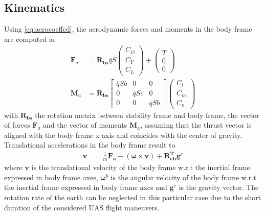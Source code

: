 \documentclass{ifacconf}
\newcommand{\mbf}[1]{\mathbf{#1}}
\providecommand{\mbf}[1]{\mathbf{#1}}
\newcommand{\Rbs}{{\ensuremath{\mbf{R_{b   s}}}}}
\newcommand{\Rbe}{{\ensuremath{\mbf{R^T_{e  b}}}}}
\newcommand{\qbar}{\ensuremath{\bar{q}}}
\begin{document}
\subsection{Kinematics}
Using \ref{eq:aerocoeffcd}, the aerodynamic forces and moments in the body frame are computed as
\begin{align}
\label{eq:coeff2realforcesandmoments}
\mathbf{F}_a
&=
\Rbs
\bar{q}
S
\begin{pmatrix}
C_D \\ 
C_Y \\
C_L 
\end{pmatrix}
+
\begin{pmatrix}
T \\ 
0 \\
0 
\end{pmatrix}\\
\mathbf{M}_a
&=
\Rbs
\begin{bmatrix}
\qbar S b & 0 & 0 \\
0 & \qbar S c & 0 \\
0& 0 & \qbar S b 
\end{bmatrix}
\begin{pmatrix}
C_l \\ 
C_m \\
C_n 
\end{pmatrix}
\end{align}
with $\Rbs$ the rotation matrix between stability frame and body frame, the vector of forces $\mathbf{F}_a$ and the vector of moments $\mathbf{M}_a$, assuming that the thrust vector is aligned with the body frame x axis and coincides with the center of gravity.
Translational accelerations in the body frame result to
\begin{align}
\label{eq:forces2accelerations}
\dot{\mathbf{v}} &= \frac{1}{m}\mathbf{F_a} 
- (\mathbf{\omega} \times \mathbf{v}) 
+
\Rbe
\mathbf{g}^e
\end{align}
where $\mathbf{v}$ is the translational velocity of the body frame w.r.t the inertial frame expressed in body frame axes, 
$\mathbf{\omega}^{b}$ is the angular velocity of the body frame w.r.t the inertial frame expressed in body frame axes and $\mathbf{g}^e$ is the gravity vector. The rotation rate of the earth can be neglected in this particular case due to the short duration of the considered UAS flight maneuvers.\\
\end{document}
